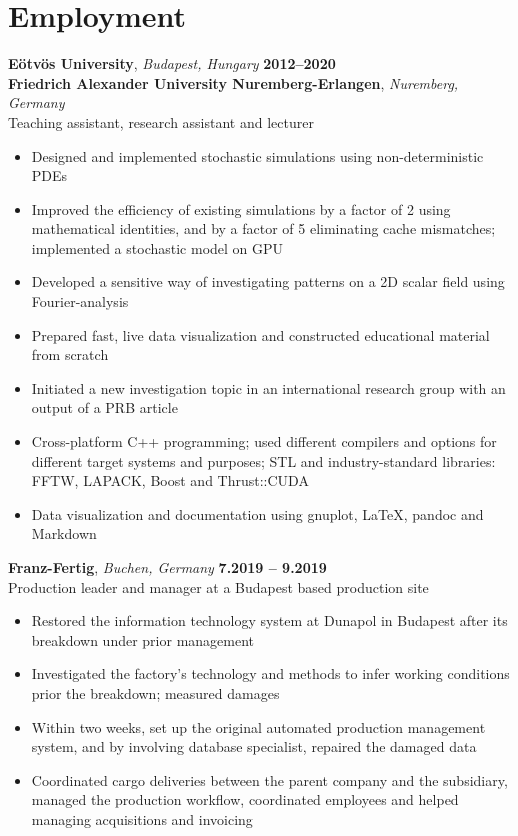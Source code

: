 \documentclass[10pt,USletter,sans]{moderncv}        %
\begin{document}
\makecvtitle
\section{Employment}
\textbf{Eötvös University}, \emph{Budapest, Hungary}  \hfill \textbf{2012--2020}\\
\textbf{Friedrich Alexander University Nuremberg-Erlangen}, \emph{Nuremberg, Germany}\\
Teaching assistant, research assistant and lecturer
\begin{itemize}
\item Designed and implemented stochastic simulations using non-deterministic PDEs
\item Improved the efficiency of existing simulations by a factor of 2 using mathematical identities, and by a factor of 5 eliminating cache mismatches; implemented a stochastic model on GPU
\item Developed a sensitive way of investigating patterns on a 2D scalar field using Fourier-analysis
\item Prepared fast, live data visualization and constructed educational material from scratch
\item Initiated a new investigation topic in an international research group with an output of a PRB article
\item Cross-platform C++ programming; used different compilers and options for different target systems and purposes; STL and industry-standard libraries: FFTW, LAPACK, Boost and Thrust::CUDA
\item Data visualization and documentation using gnuplot, LaTeX, pandoc and Markdown
\end{itemize}
\vspace{6pt}

\textbf{Franz-Fertig}, \emph{Buchen, Germany}  \hfill \textbf{7.2019 -- 9.2019}\\
Production leader and manager at a Budapest based production site

\begin{itemize}
\item Restored the information technology system at Dunapol in Budapest after its breakdown under prior management
\item Investigated the factory's technology and methods to infer working conditions prior the breakdown; measured damages
\item Within two weeks, set up the original automated production management system, and by involving database specialist, repaired the damaged data
\item Coordinated cargo deliveries between the parent company and the subsidiary, managed the production workflow, coordinated employees and helped managing acquisitions and invoicing
\end{itemize}
\vspace{3pt}
\end{document}
